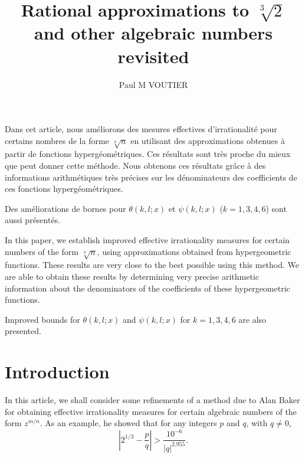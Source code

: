 \documentclass{jT}
\theoremstyle{definition}
\begin{document}
\title[Rational approximations \ldots]{Rational approximations to $\sqrt[3]{2}$ and other algebraic numbers revisited}

\author[Paul M {\sc Voutier}]{{\sc Paul M} VOUTIER}
\address{Paul M {\sc Voutier}\\
London, UK}

\maketitle

\begin{resume}
Dans cet article, nous am\'{e}liorons des mesures effectives d'irrationalit\'{e} 
pour certains nombres de la forme $\sqrt[3]{n}$ en utilisant des approximations obtenues
\`{a} partir de fonctions hyperg\'{e}om\'{e}triques. Ces r\'{e}sultats sont tr\`{e}s proche du mieux que peut donner cette m\'ethode. Nous obtenons ces r\'{e}sultats gr\^ace \`a des  informations arithm\'{e}tiques tr\`{e}s pr\'{e}cises sur les d\'{e}nominateurs des coefficients de ces fonctions hyperg\'{e}om\'etriques.

Des am\'eliorations  de bornes pour $\theta(k,l;x)$ et $\psi(k,l;x)$  ($k=1,3,4,6$) sont  aussi pr\'{e}sent\'{e}s.
\end{resume}

\begin{abstr}
In this paper, we establish improved effective irrationality measures
for certain numbers of the form $\sqrt[3]{n}$, using approximations obtained from
hypergeometric functions. These results are very close to the best possible using this
method. We are able to obtain these results by determining very precise arithmetic
information about the denominators of the coefficients of these hypergeometric functions.

Improved bounds for $\theta(k,l;x)$ and $\psi(k,l;x)$ for $k=1,3,4,6$ are also presented.
\end{abstr}

\bigskip
\section{Introduction}

In this article, we shall consider some refinements of a method due to Alan Baker \cite{Baker1,Baker2}
for obtaining effective irrationality measures for certain algebraic numbers of the form
$z^{m/n}$. As an example, he showed that for any integers $p$ and $q$, with $q \neq 0$, 
\begin{displaymath}
\left| 2^{1/3} - \frac{p}{q} \right| > \frac{10^{-6}}{|q|^{2.955}}. 
\end{displaymath}
\end{document}
